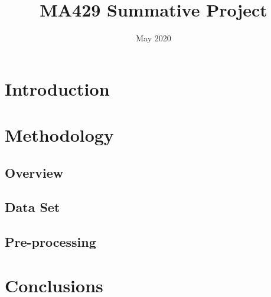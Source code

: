 \documentclass[a4paper, oneside, 11pt]{article}
\title{MA429 Summative Project}
\author{}
\date{May 2020}
\begin{document}
\maketitle

\section{Introduction}


\section{Methodology}
\subsection{Overview}


\subsection{Data Set}

\subsection{Pre-processing}


\section{Conclusions}




\end{document}
